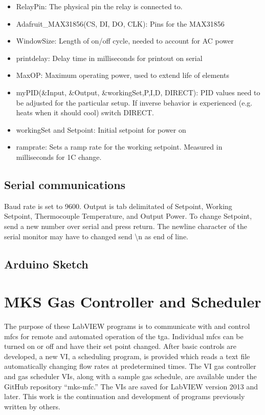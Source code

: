         \begin{itemize}
        \item
          RelayPin: The physical pin the relay is connected to.
        \item
          Adafruit\_MAX31856(CS, DI, DO, CLK): Pins for the MAX31856
        \item
          WindowSize: Length of on/off cycle, needed to account for AC power
        \item
          printdelay: Delay time in milliseconds for printout on serial
        \item
          MaxOP: Maximum operating power, used to extend life of elements
        \item
          myPID(\&Input, \&Output, \&workingSet,P,I,D, DIRECT): PID values need to be adjusted for the particular setup.
          If inverse behavior is experienced (e.g. heats when it should cool) switch DIRECT.
        \item
          workingSet and Setpoint: Initial setpoint for power on
        \item
          ramprate: Sets a ramp rate for the working setpoint. Measured in
          milliseconds for 1C change.
        \end{itemize}

    \subsection{Serial communications}
        Baud rate is set to 9600.
        Output is tab delimitated of Setpoint, Working
        Setpoint, Thermocouple Temperature, and Output Power.
        To change Setpoint, send a new number over serial and press return.
        The newline character of the serial monitor may have to changed send \textbackslash n as end of line.

    \subsection{Arduino Sketch}
        

\section{MKS Gas Controller and Scheduler}
    \label{app:gasvi}
    The purpose of these LabVIEW programs is to communicate with and control \glspl{mfc} for remote and automated operation of the \gls{tga}.
    Individual \glspl{mfc} can be turned on or off and have their set point changed.
    After basic controls are developed, a new VI, a scheduling program, is provided which reads a text file automatically changing flow rates at predetermined times.
    The VI gas controller and gas scheduler VIs, along with a sample gas schedule, are available under the GitHub repository ``mks-mfc.''
    The VIs are saved for LabVIEW version 2013 and later.
    This work is the continuation and development of programs previously written by others.

